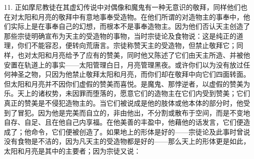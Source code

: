 11. 正如摩尼教徒在其虚幻传说中对偶像和魔鬼有一种无意识的敬拜，同样他们也在对太阳和月亮的敬拜中有意地事奉受造物。在他们所谓的对造物主的事奉中，他们实际上是在事奉自己的幻想，而根本不是事奉造物主。因为他们否认天主创造了那些宗徒明确宣布为天主的受造物的事物，当时宗徒论及食物说：这是纯正的道理，你们不能容忍，便转向荒唐言。宗徒称赞天主的受造物，但禁止敬拜它；同样，也对太阳和月亮给予了应有的赞美，同时他又陈述了它们由天主所造、并被他安置在轨道上的事实——太阳管理白日，月亮管理黑夜。或许你们以为没有放过任何神圣之物，只因为他禁止敬拜太阳和月亮，而你们却在敬拜中向它们四面转面。但太阳和月亮并不因你们虚假的赞美而喜悦。是魔鬼、那悖逆者，以虚假的赞美为乐。天上的诸权势，未因罪而堕落的，愿意它们的造物主在它们内受到赞美；它们真正的赞美是不侵犯造物主的。当它们被说成是他的肢体或他本体的部分时，他受到了冒犯。因为他是完美而自立的，非由他出，不分割或散布于空间，而是不变地自存、自足、且在他自己内享福。在他美善的丰盈中，他藉他的话发言，它们便造成了；他命令，它们便被创造了。如果地上的形体是好的——宗徒论及此事时曾说没有食物是不洁的，因为凡天主的受造物都是好的——那么天上的形体更是如此，太阳和月亮是其中的主要者；因为宗徒又说：\par

